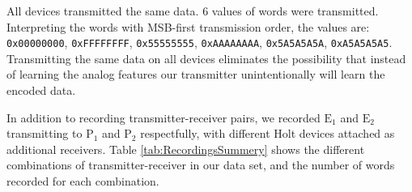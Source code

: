 \documentclass[conference]{IEEEtran}
\begin{document}
  All devices transmitted the same data. 6 values of words were transmitted. Interpreting the words with MSB-first transmission order, the values are: \texttt{0x00000000}, \texttt{0xFFFFFFFF}, \texttt{0x55555555}, \texttt{0xAAAAAAAA}, \texttt{0x5A5A5A5A}, \texttt{0xA5A5A5A5}. Transmitting the same data on all devices eliminates the possibility that instead of learning the analog features our transmitter unintentionally will learn the encoded data.
  
  In addition to recording transmitter-receiver pairs, we recorded \(\text{E}_1\) and \(\text{E}_2\) transmitting to \(\text{P}_1\) and \(\text{P}_2\) respectfully, with different Holt devices attached as additional receivers. Table \ref{tab:RecordingsSummery} shows the different combinations of transmitter-receiver in our data set, and the number of words recorded for each combination.
  
\end{document}
